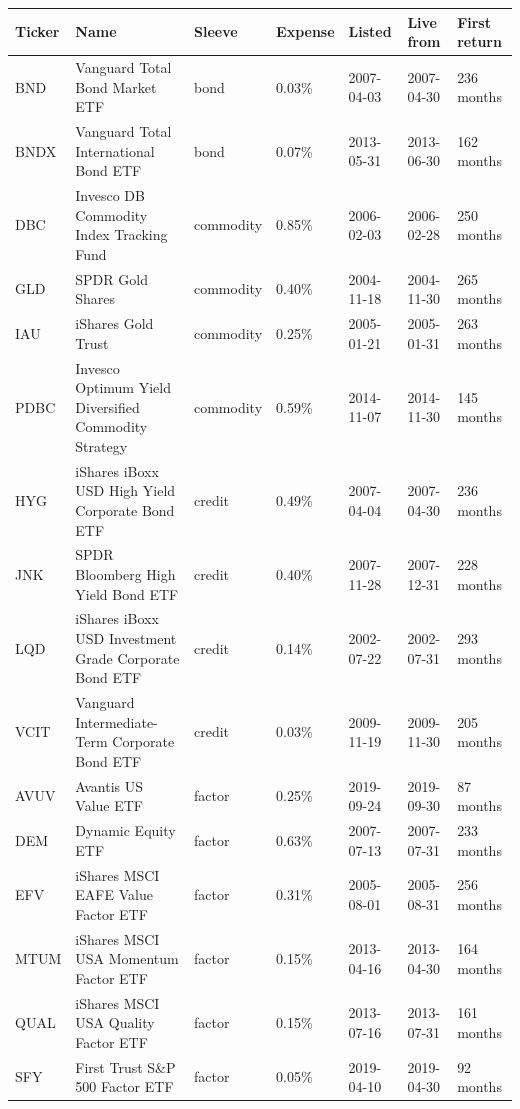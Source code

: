 \begin{tabularx}{\textwidth}{@{}P{0.46in}P{1.06in}P{0.62in}P{0.48in}P{0.50in}P{0.54in}Y@{}}
\toprule
Ticker & Name & Sleeve & Expense & Listed & Live from & First return \\
\midrule
BND & Vanguard Total Bond Market ETF & bond & 0.03\% & 2007-04-03 & 2007-04-30 & 236 months \\
BNDX & Vanguard Total International Bond ETF & bond & 0.07\% & 2013-05-31 & 2013-06-30 & 162 months \\
DBC & Invesco DB Commodity Index Tracking Fund & commodity & 0.85\% & 2006-02-03 & 2006-02-28 & 250 months \\
GLD & SPDR Gold Shares & commodity & 0.40\% & 2004-11-18 & 2004-11-30 & 265 months \\
IAU & iShares Gold Trust & commodity & 0.25\% & 2005-01-21 & 2005-01-31 & 263 months \\
PDBC & Invesco Optimum Yield Diversified Commodity Strategy & commodity & 0.59\% & 2014-11-07 & 2014-11-30 & 145 months \\
HYG & iShares iBoxx USD High Yield Corporate Bond ETF & credit & 0.49\% & 2007-04-04 & 2007-04-30 & 236 months \\
JNK & SPDR Bloomberg High Yield Bond ETF & credit & 0.40\% & 2007-11-28 & 2007-12-31 & 228 months \\
LQD & iShares iBoxx USD Investment Grade Corporate Bond ETF & credit & 0.14\% & 2002-07-22 & 2002-07-31 & 293 months \\
VCIT & Vanguard Intermediate-Term Corporate Bond ETF & credit & 0.03\% & 2009-11-19 & 2009-11-30 & 205 months \\
AVUV & Avantis US Value ETF & factor & 0.25\% & 2019-09-24 & 2019-09-30 & 87 months \\
DEM & Dynamic Equity ETF & factor & 0.63\% & 2007-07-13 & 2007-07-31 & 233 months \\
EFV & iShares MSCI EAFE Value Factor ETF & factor & 0.31\% & 2005-08-01 & 2005-08-31 & 256 months \\
MTUM & iShares MSCI USA Momentum Factor ETF & factor & 0.15\% & 2013-04-16 & 2013-04-30 & 164 months \\
QUAL & iShares MSCI USA Quality Factor ETF & factor & 0.15\% & 2013-07-16 & 2013-07-31 & 161 months \\
SFY & First Trust S\&P 500 Factor ETF & factor & 0.05\% & 2019-04-10 & 2019-04-30 & 92 months \\

\end{tabularx}
